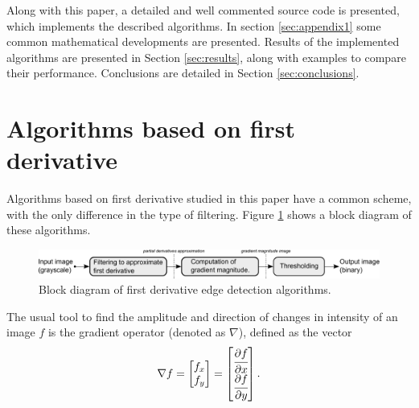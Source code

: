 \documentclass{ipol}
\numberwithin{equation}{section}
\numberwithin{table}{section}
\begin{document}
Along with this paper, a detailed and well commented source code is presented, which 
implements the described algorithms. In section \ref{sec:appendix1} some common mathematical developments are presented. 
Results of the implemented algorithms are presented in Section \ref{sec:results}, along with examples 
to compare their performance. Conclusions are detailed in Section \ref{sec:conclusions}.

\nocite{IPOL}


\section{Algorithms based on first derivative}
\label{sec:first}

Algorithms based on first derivative studied in this paper have a common scheme, with 
the only difference in the type of filtering. Figure \ref{fig:blockdiagram1} shows
a block diagram of these algorithms. \\

\begin{figure}[!h]
	\centering
	\includegraphics[width=\textwidth]{blockdiagram1.pdf}
	\caption{Block diagram of first derivative edge detection algorithms.}
	\label{fig:blockdiagram1}
\end{figure}

The usual tool to find the amplitude and direction of changes in 
intensity of an image $f$ is the gradient operator (denoted as $\nabla$), defined 
as the vector
\begin{equation}
	\nabla f = 
				\begin{bmatrix} 
					f_x \\ f_y
				\end{bmatrix}
	=				
				\begin{bmatrix} 
					\cfrac{\partial f}{\partial x} \\ \cfrac{\partial f}{\partial y} \\
				\end{bmatrix}.
\end{equation}
\end{document}
